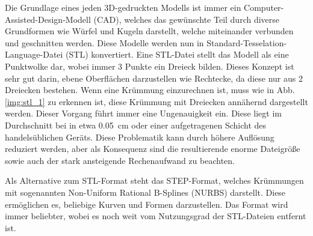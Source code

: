 \documentclass[main.tex]{subfiles}
\begin{document}
Die Grundlage eines jeden 3D-gedruckten Modells ist immer ein Computer-Assisted-Design-Modell (CAD), welches das gewünschte Teil durch diverse Grundformen wie Würfel und Kugeln darstellt, welche miteinander verbunden und geschnitten werden. Diese Modelle werden nun in Standard-Tesselation-Language-Datei (STL) konvertiert. Eine STL-Datei stellt das Modell als eine Punktwolke dar, wobei immer 3 Punkte ein Dreieck bilden.
Dieses Konzept ist sehr gut darin, ebene Oberflächen darzustellen wie Rechtecke, da diese nur aus 2 Dreiecken bestehen. Wenn eine Krümmung einzurechnen ist, muss wie in Abb. \ref{img:stl_1} zu erkennen ist, diese Krümmung mit Dreiecken annähernd dargestellt werden. Dieser Vorgang führt immer eine Ungenauigkeit ein. Diese liegt im Durchschnitt bei in etwa \qty{0.05}{\centi\metre} oder einer aufgetragenen Schicht des handelsüblichen Geräts. Diese Problematik kann durch höhere Auflösung reduziert werden, aber als Konsequenz sind die resultierende enorme Dateigröße sowie auch der stark ansteigende Rechenaufwand zu beachten. \parencite{ADOBLESTL} 


Als Alternative zum STL-Format steht das STEP-Format, welches Krümmungen mit sogenannten Non-Uniform Rational B-Splines (NURBS) darstellt.
Diese ermöglichen es, beliebige Kurven und Formen darzustellen. Das Format wird immer beliebter, wobei es noch weit  vom Nutzungsgrad der STL-Dateien entfernt ist. \parencite{ADOBESTEP}
\end{document}
